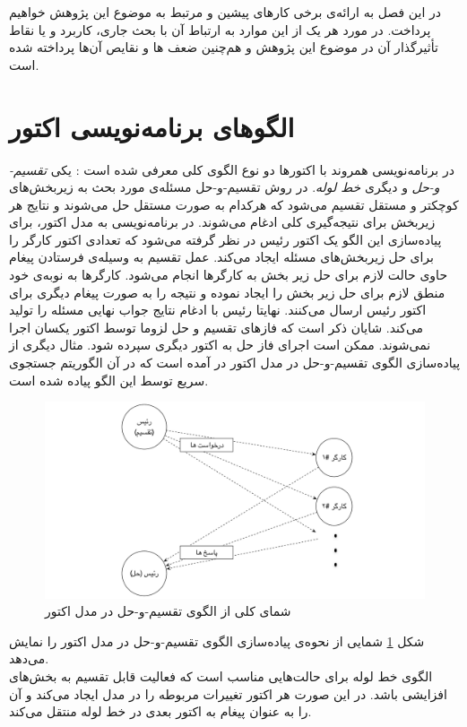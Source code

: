 در این فصل به ارائه‌ی برخی کارهای پیشین و مرتبط به موضوع این پژوهش خواهیم پرداخت. در مورد هر یک از این موارد به ارتباط آن با بحث جاری، کاربرد و یا نقاط تأثیرگذار آن در موضوع این پژوهش و هم‌چنین ضعف ها و نقایص آن‌ها پرداخته شده است. 
\section{الگوهای برنامه‌نویسی اکتور}
\label{section:actorPatterns}
در برنامه‌نویسی همروند با اکتور‌ها دو نوع الگوی کلی معرفی شده است \cite{Agha1990}: یکی  \textit{\gls{تقسیم-و-حل}} و دیگری \textit{\gls{خط لوله}}. 
در روش تقسیم-و-حل مسئله‌ی مورد بحث به زیربخش‌های کوچکتر و مستقل تقسیم می‌شود که هرکدام به صورت مستقل حل می‌شوند و نتایج هر زیربخش برای نتیجه‌گیری کلی ادغام می‌شوند. در برنامه‌نویسی به مدل اکتور، برای پیاده‌سازی این الگو یک اکتور رئیس در نظر گرفته می‌شود که تعدادی اکتور کارگر را برای حل زیربخش‌های مسئله ایجاد می‌کند. عمل تقسیم به وسیله‌ی فرستادن پیغام‌ حاوی حالت لازم برای حل زیر بخش به کارگر‌ها انجام می‌شود. کارگرها به نوبه‌ی خود منطق لازم برای حل زیر بخش را ایجاد نموده و نتیجه را به صورت پیغام دیگری برای اکتور رئیس ارسال می‌کنند. نهایتا رئیس با ادغام نتایج جواب نهایی 
مسئله را تولید می‌کند. شایان ذکر است که فازهای تقسیم و حل لزوما توسط اکتور یکسان اجرا نمی‌شوند. ممکن است اجرای فاز حل به اکتور دیگری سپرده شود.\cite{Feng08scalablemodels}
مثال دیگری از پیاده‌سازی الگوی تقسیم-و-حل در مدل اکتور  در \cite{Feng08scalablemodels} آمده است که در آن الگوریتم جستجوی سریع توسط این الگو پیاده شده است.
\begin{figure}
    \begin{center}
	\includegraphics[width=16cm]{3-RelatedWork/Figures/Divide_and_Conquer.pdf}
    \end{center}
    \caption{\label{fig:divide_conquer}  شمای کلی از الگوی تقسیم-و-حل در مدل اکتور }
\end{figure}
شکل \ref{fig:divide_conquer} شمایی از نحوه‌ی پیاده‌سازی الگوی تقسیم-و-حل در مدل اکتور را نمایش می‌دهد.\\
الگوی خط لوله برای حالت‌هایی مناسب است که فعالیت قابل تقسیم به بخش‌های افزایشی باشد. در این صورت هر اکتور تغییرات مربوطه را در مدل ایجاد می‌کند و آن را به عنوان پیغام به اکتور بعدی در خط لوله منتقل می‌کند.

